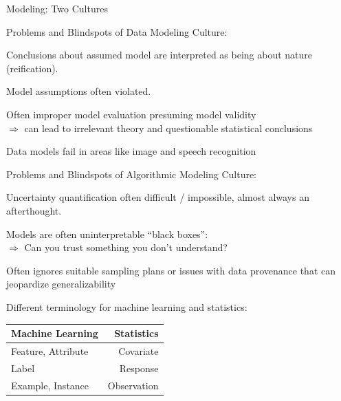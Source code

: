 \begin{vbframe}{Modeling: Two Cultures}

\begin{blocki}{Problems and Blindspots of Data Modeling Culture:}
  \item Conclusions about assumed model are interpreted as being about nature (reification).
  \item Model assumptions often violated.
  \item Often improper model evaluation presuming model validity\\
  $\Rightarrow$ can lead to irrelevant theory and questionable statistical conclusions
  \item Data models fail in areas like image and speech recognition
\end{blocki}

\framebreak

\begin{blocki}{Problems and Blindspots of Algorithmic Modeling Culture:}
  \item Uncertainty quantification often difficult / impossible, almost always an afterthought.
  \item Models are often uninterpretable \enquote{black boxes}: \\
  $\Rightarrow$ Can you trust something you don't understand?
  \item Often ignores suitable sampling plans or issues with data provenance that can jeopardize generalizability
\end{blocki}

%
%


\framebreak
Different terminology for machine learning and statistics:

\begin{small}
  \begin{table}
    \begin{tabular}{lr}
      \hline
      Machine Learning & Statistics \\
      \hline
      Feature, Attribute & Covariate \\
      Label & Response \\
      Example, Instance & Observation \\[.3em]


\end{tabular}
\end{table}
\end{small}
\end{vbframe}
